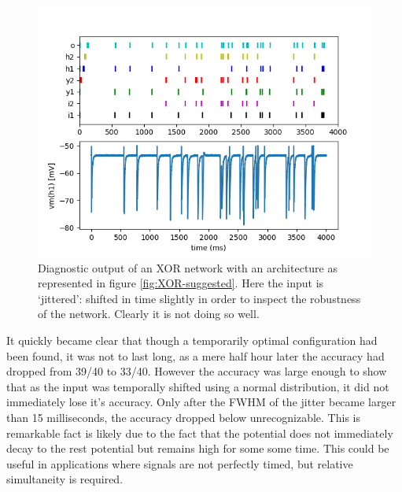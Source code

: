 \documentclass[a4paper,twocolumn]{article}
\begin{document}
\begin{figure}
    \centering
    \includegraphics[width=.5\textwidth]{figures/XOR-output.png}
    \caption{Diagnostic output of an XOR network with an architecture as
        represented in figure \ref{fig:XOR-suggested}. Here the input is
        `jittered': shifted in time slightly in order to inspect the robustness
        of the network. Clearly it is not doing so well.}
    \label{fig:XOR-output}
\end{figure}

It quickly became clear that though a temporarily optimal configuration had been
found, it was not to last long, as a mere half hour later the accuracy had
dropped from 39/40 to 33/40. However the accuracy was large enough to show that
as the input was temporally shifted using a normal distribution, it did not
immediately lose it's accuracy. Only after the FWHM of the jitter became larger
than 15 milliseconds, the accuracy dropped below unrecognizable. This is
remarkable fact is likely due to the fact that the potential does not
immediately decay to the rest potential but remains high for some some time.
This could be useful in applications where signals are not perfectly timed, but
relative simultaneity is required.
\end{document}
